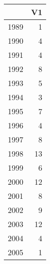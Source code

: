 \begin{table}[ht]
\centering
\begin{tabular}{rr}
  \hline
 & V1 \\ 
  \hline
1989 &   1 \\ 
  1990 &   4 \\ 
  1991 &   4 \\ 
  1992 &   8 \\ 
  1993 &   5 \\ 
  1994 &   3 \\ 
  1995 &   7 \\ 
  1996 &   4 \\ 
  1997 &   8 \\ 
  1998 &  13 \\ 
  1999 &   6 \\ 
  2000 &  12 \\ 
  2001 &   8 \\ 
  2002 &   9 \\ 
  2003 &  12 \\ 
  2004 &   4 \\ 
  2005 &   1 \\ 
   \hline
\end{tabular}
\end{table}
